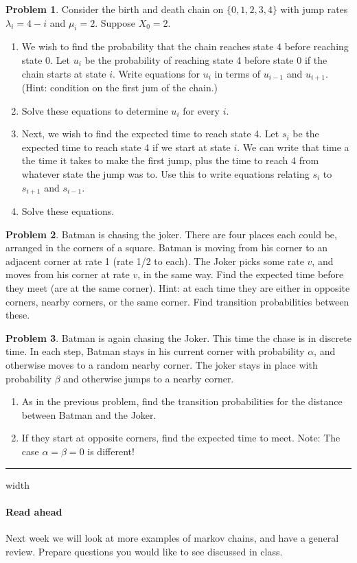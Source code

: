 \documentclass{article}
\theoremstyle{definition}
\newtheorem{problem}{Problem}
\begin{document}
\begin{problem}
  Consider the birth and death chain on $\{0,1,2,3,4\}$ with jump rates $\lambda_i = 4-i$ and $\mu_i = 2$.
  Suppose $X_0=2$.
  \begin{enumerate}
  \item  We wish to find the probability that the chain reaches state $4$ before reaching state 0.
    Let $u_i$ be the probability of reaching state 4 before state 0 if the chain starts at state $i$.
    Write equations for $u_i$ in terms of $u_{i-1}$ and $u_{i+1}$.
    (Hint: condition on the first jum of the chain.)
  \item Solve these equations to determine $u_i$ for every $i$.
  \item Next, we wish to find the expected time to reach state 4.
    Let $s_i$ be the expected time to reach state 4 if we start at state $i$.
    We can write that time a the time it takes to make the first jump, plus the time to reach 4 from whatever state the jump was to.
    Use this to write equations relating $s_i$ to $s_{i+1}$ and $s_{i-1}$.
  \item Solve these equations.
  \end{enumerate}
\end{problem}


\begin{problem}
  Batman is chasing the joker.
  There are four places each could be, arranged in the corners of a square.
  Batman is moving from his corner to an adjacent corner at rate 1 (rate 1/2 to each).
  The Joker picks some rate $v$, and moves from his corner at rate $v$, in the same way.
  Find the expected time before they meet (are at the same corner).
  Hint: at each time they are either in opposite corners, nearby corners, or the same corner. Find transition probabilities between these.
\end{problem}


\begin{problem}
  Batman is again chasing the Joker.
  This time the chase is in discrete time.
  In each step, Batman stays in his current corner with probability $\alpha$, and otherwise moves to a random nearby corner.
  The joker stays in place with probability $\beta$ and otherwise jumps to a nearby corner.
  \begin{enumerate}
  \item As in the previous problem, find the transition probabilities for the distance between Batman and the Joker.
  \item If they start at opposite corners, find the expected time to meet.
    Note: The case $\alpha=\beta=0$ is different!
  \end{enumerate}
\end{problem}


\hrule width \textwidth

\paragraph{Read ahead}
Next week we will look at more examples of markov chains, and have a general review. Prepare questions you would like to see discussed in class.
\end{document}
